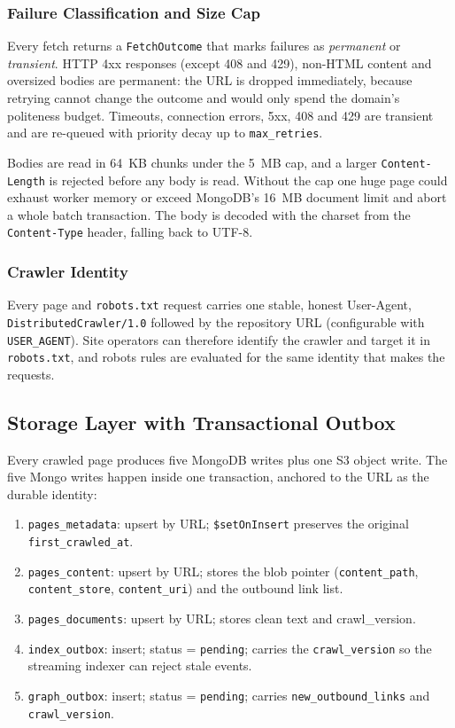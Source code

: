 \documentclass[11pt,a4paper]{article}
\newcommand{\code}[1]{\texttt{#1}}
\begin{document}
\subsubsection{Failure Classification and Size Cap}

Every fetch returns a \code{FetchOutcome} that marks failures as \emph{permanent} or \emph{transient}. HTTP 4xx responses (except 408 and 429), non-HTML content and oversized bodies are permanent: the URL is dropped immediately, because retrying cannot change the outcome and would only spend the domain's politeness budget. Timeouts, connection errors, 5xx, 408 and 429 are transient and are re-queued with priority decay up to \code{max\_retries}.

Bodies are read in 64~KB chunks under the 5~MB cap, and a larger \code{Content-Length} is rejected before any body is read. Without the cap one huge page could exhaust worker memory or exceed MongoDB's 16~MB document limit and abort a whole batch transaction. The body is decoded with the charset from the \code{Content-Type} header, falling back to UTF-8.

\subsubsection{Crawler Identity}

Every page and \code{robots.txt} request carries one stable, honest User-Agent, \code{DistributedCrawler/1.0} followed by the repository URL (configurable with \code{USER\_AGENT}). Site operators can therefore identify the crawler and target it in \code{robots.txt}, and robots rules are evaluated for the same identity that makes the requests.

\subsection{Storage Layer with Transactional Outbox}
\label{sec:storage}

Every crawled page produces five MongoDB writes plus one S3 object write. The five Mongo writes happen inside one transaction, anchored to the URL as the durable identity:

\begin{enumerate}
  \item \code{pages\_metadata}: upsert by URL; \code{\$setOnInsert} preserves the original \code{first\_crawled\_at}.
  \item \code{pages\_content}: upsert by URL; stores the blob pointer (\code{content\_path}, \code{content\_store}, \code{content\_uri}) and the outbound link list.
  \item \code{pages\_documents}: upsert by URL; stores clean text and crawl\_version.
  \item \code{index\_outbox}: insert; status = \code{pending}; carries the \code{crawl\_version} so the streaming indexer can reject stale events.
  \item \code{graph\_outbox}: insert; status = \code{pending}; carries \code{new\_outbound\_links} and \code{crawl\_version}.
\end{enumerate}
\end{document}

